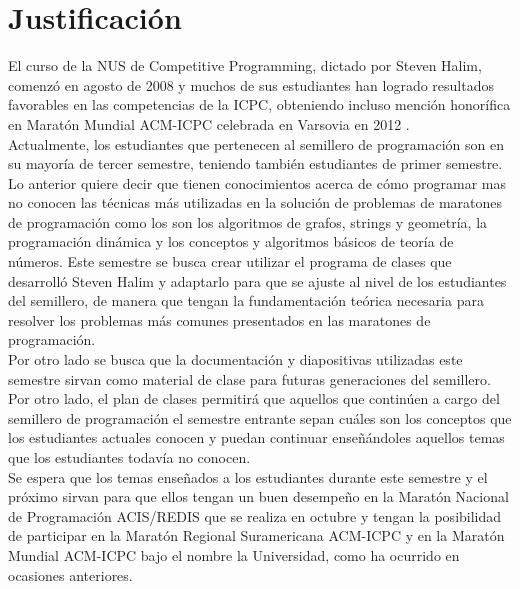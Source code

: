 \documentclass[11pt, oneside]{article}
\theoremstyle{definition}
\theoremstyle{remark}
\begin{document}
\section{Justificación}
El curso de la NUS de Competitive Programming, dictado por Steven Halim, comenzó en agosto de 2008 y muchos de sus estudiantes han logrado resultados favorables en las competencias de la ICPC, obteniendo incluso mención honorífica en Maratón Mundial ACM-ICPC celebrada en Varsovia en 2012 \cite{AlgoNUS}.\\
Actualmente, los estudiantes que pertenecen al semillero de programación son en su mayoría de tercer semestre, teniendo también estudiantes de primer semestre. Lo anterior quiere decir que tienen conocimientos acerca de cómo programar mas no conocen las técnicas más utilizadas en la solución de problemas de maratones de programación como los son los algoritmos de grafos, strings y geometría, la programación dinámica y los conceptos y algoritmos básicos de teoría de números. Este semestre se busca crear utilizar el programa de clases que desarrolló Steven Halim y adaptarlo para que se ajuste al nivel de los estudiantes del semillero, de manera que tengan la fundamentación teórica necesaria para resolver los problemas más comunes presentados en las maratones de programación.\\
Por otro lado se busca que la documentación y diapositivas utilizadas este semestre sirvan como material de clase para futuras generaciones del semillero. Por otro lado, el plan de clases permitirá que aquellos que continúen a cargo del semillero de programación el semestre entrante sepan cuáles son los conceptos que los estudiantes actuales conocen y puedan continuar enseñándoles aquellos temas que los estudiantes todavía no conocen.\\
Se espera que los temas enseñados a los estudiantes durante este semestre y el próximo sirvan para que ellos tengan un buen desempeño en la Maratón Nacional de Programación ACIS/REDIS que se realiza en octubre y tengan la posibilidad de participar en la Maratón Regional Suramericana ACM-ICPC y en la Maratón Mundial ACM-ICPC bajo el nombre la Universidad, como ha ocurrido en ocasiones anteriores.
\end{document}

